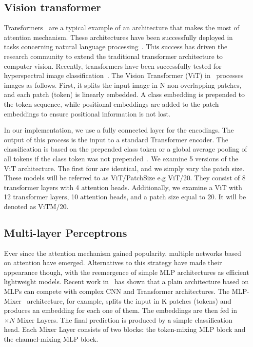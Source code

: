 \documentclass[journal]{IEEEtran}
\begin{document}
\subsection{Vision transformer}
\label{sec:vit}
Transformers~\citep{DBLP:journals/corr/VaswaniSPUJGKP17} are a typical example of an architecture that makes the most of attention mechanism. These architectures have been successfully deployed in tasks concerning natural language processing~\citep{devlin2018bert}. This success has driven the research community to extend the traditional transformer architecture to computer vision. Recently, transformers have been successfully tested for hyperspectral image classification~\citep{9565208}. 
The Vision Transformer (ViT) in~\cite{DBLP:journals/corr/abs-2010-11929} processes images as follows. First, it splits the input image in N non-overlapping patches, and each patch (token) is linearly embedded. A class embedding is prepended to the token sequence, while positional embeddings are added to the patch embeddings to ensure positional information is not lost. 

In our implementation, we use a fully connected layer for the encodings. The output of this process is the input to a standard Transformer encoder. The classification is based on the prepended class token or a global average pooling of all tokens if the class token was not prepended~\citep{arnab2021vivit}. 
 We examine 5 versions of the ViT architecture. The first four are identical, and we simply vary the patch size. These models will be referred to as ViT/PatchSize e.g ViT/20. They consist of 8 transformer layers with 4 attention heads. Additionally, we examine a ViT with 12 transformer layers, 10 attention heads, and a patch size equal to 20. It will be denoted as ViTM/20.

\subsection{Multi-layer Perceptrons}
\label{sec:mlp}
Ever since the attention mechanism gained popularity, multiple networks based on attention have emerged. Alternatives to this strategy have made their appearance though, with the reemergence of simple MLP architectures as efficient lightweight models. Recent work in~\cite{tolstikhin2021mlpmixer} has shown that a plain architecture based on MLPs can compete with complex CNN and Transformer architectures. The MLP-Mixer~\citep{tolstikhin2021mlpmixer} architecture, for example, splits the input in K patches (tokens) and produces an embedding for each one of them. The embeddings are then fed in $\times N$ Mixer Layers. The final prediction is produced by a simple classification head. Each Mixer Layer consists of two blocks: the token-mixing MLP block and the channel-mixing MLP block. 
\end{document}
